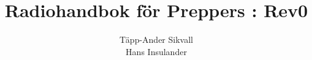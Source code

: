 \documentclass[12ypt,swedish,a4paper]{report}
\begin{document}
\title{Radiohandbok för Preppers : Rev0}
\author{Täpp-Ander Sikvall\\Hans Insulander}
\maketitle

\listoftodos
\clearpage



\tableofcontents

\setlength{\parskip}{1em plus 0.3em minus 0.1em}
\setlength{\parindent}{0pt}

\pagestyle{fancy}

\lhead{\nouppercase{\leftmark}}
\chead{}
\rhead{\nouppercase{\rightmark}}

\cfoot{\thepage}

\renewcommand{\headrulewidth}{0.2pt}
\renewcommand{\footrulewidth}{0.2pt}







\end{document}

